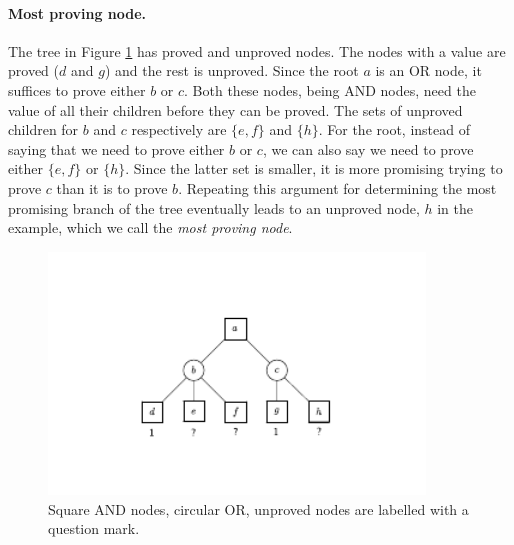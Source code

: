 \documentclass[a4paper, 11pt]{article}
\begin{document}
\paragraph{Most proving node.}
The tree in Figure \ref{tree:pnex} has proved and unproved nodes. The nodes with a value are proved ($d$ and $g$) and the rest is unproved.
Since the root $a$ is an OR node, it suffices
to prove either $b$ or $c$. Both these nodes, being AND nodes, need the value of all their children before they can be proved. The sets of
unproved children for $b$ and $c$ respectively are $\{e, f\}$ and $\{h\}$. For the root, instead of saying that we need to prove
either $b$ or $c$, we can also say we need to prove either $\{e, f\}$ or $\{h\}$. Since the latter set is smaller, it is more
promising trying to prove $c$ than it is to prove $b$. Repeating this argument for determining the most promising branch of the tree
eventually leads to an unproved node, $h$ in the example, which we call the \textit{most proving node}.\\

\begin{figure}[h]
\center
\includegraphics[width=10cm]{proofset.pdf}
\caption{Square AND nodes, circular OR, unproved nodes are labelled with a question mark.}
\label{tree:pnex}
\end{figure}
\end{document}
